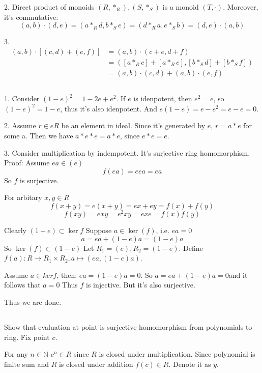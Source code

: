 \documentclass{amsart}
\def\N{\mathbb{N}}
\begin{document}
2. Direct product of monoids $(R, *_R), (S, *_S)$ is a monoid $(T, \cdot)$. Moreover, it's commutative:
$$(a,b) \cdot (d,e) = (a *_R d ,b *_S e) = (d *_R a, e *_S b) = (d,e) \cdot (a,b)$$

3. 
\begin{align*}
    (a,b) \cdot [(c,d) + (e,f)] &= (a,b) \cdot (c+e, d+f) \\ &= ([a *_R c] + [a *_R e], [b *_S d] + [b *_S f])\\
     &= (a,b) \cdot (c,d) + (a,b) \cdot (e,f)
\end{align*}

\subsection{}

1. Consider $(1-e)^2 = 1 - 2e + e^2$. If $e$ is idenpotent, then $e^2=e$, so $(1-e)^2 = 1-e$, thus it's also idenpotent. And $e (1-e) = e - e^2 = e -e = 0$.

2. Assume $r \in eR$ be an element in ideal. Since it's generated by $e$, $r = a * e$ for some a. Then we have $a * e * e = a * e$, since $e*e = e$.

3. 
Consider multiplication by indempotent. It's surjective ring homomorphism. 
Proof:
Assume $ea \in (e)$
$$f(ea) = eea = ea$$
So $f$ is surjective.

For arbitary $x,y \in R$
$$ f(x+y) = e(x+y) = ex + ey = f(x) + f(y)$$
$$ f(xy) = exy = e^2 xy = ex e = f(x) f(y)$$

Clearly $(1-e) \subset \ker f$
Suppose $a \in \ker (f)$, i.e. $ea = 0$
$$ a = ea + (1-e)a = (1-e)a$$
So $\ker (f) \subset (1-e)$
Let $R_1 = (e), R_2 = (1-e)$. Define $f(a) : R \to R_1 \times R_2, a\mapsto (ea, (1-e)a)$.

Assume $a \in ker f$, then:
$ea = (1-e) a =0$. So $a = ea + (1-e)a = 0$and it follows that $a = 0$
Thus $f$ is injective. But it's also surjective.

Thus we are done.

\subsection{} 

Show that evaluation at point is surjective homomorphism from polynomials to ring. Fix point $c$.

For any $n \in \N$ $c^n \in R$ since $R$ is closed under multiplication. Since polynomial is finite sum and $R$ is closed under addition $f(c) \in R$. Denote it as $y$.
\end{document}
